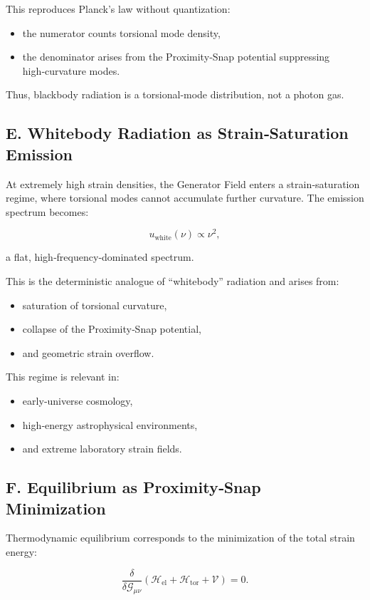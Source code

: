 \documentclass[reprint,amsmath,amssymb,aps,prl,floatfix]{revtex4-2}
\begin{document}
\begin{itemize}
This reproduces Planck’s law without quantization:
\begin{itemize}
\item the numerator counts torsional mode density,  
\item the denominator arises from the Proximity‑Snap potential suppressing high‑curvature modes.
\end{itemize}

Thus, blackbody radiation is a torsional‑mode distribution, not a photon gas.

\subsection{E. Whitebody Radiation as Strain‑Saturation Emission}

At extremely high strain densities, the Generator Field enters a strain‑saturation regime, where torsional modes cannot accumulate further curvature.  
The emission spectrum becomes:

\[
u_{\mathrm{white}}(\nu)
\propto \nu^2,
\]

a flat, high‑frequency‑dominated spectrum.

This is the deterministic analogue of “whitebody” radiation and arises from:
\begin{itemize}
\item saturation of torsional curvature,  
\item collapse of the Proximity‑Snap potential,  
\item and geometric strain overflow.
\end{itemize}

This regime is relevant in:
\begin{itemize}
\item early‑universe cosmology,  
\item high‑energy astrophysical environments,  
\item and extreme laboratory strain fields.
\end{itemize}

\subsection{F. Equilibrium as Proximity‑Snap Minimization}

Thermodynamic equilibrium corresponds to the minimization of the total strain energy:

\[
\frac{\delta}{\delta \mathcal{G}_{\mu\nu}}
\left(
\mathcal{H}_{\mathrm{el}}
+
\mathcal{H}_{\mathrm{tor}}
+
\mathcal{V}
\right)
= 0.
\]


\end{itemize}
\end{document}
